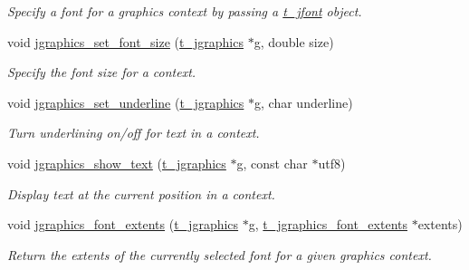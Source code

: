 \begin{DoxyCompactItemize}
\begin{DoxyCompactList}\small\item\em Specify a font for a graphics context by passing a \hyperlink{group__jfont_ga75f83f853e52af957c799723cac89ae5}{t\_\-jfont} object. \item\end{DoxyCompactList}\item 
void \hyperlink{group__jgraphics_gaf8c17f34bfbcd09ea7ba324a6a35cc9d}{jgraphics\_\-set\_\-font\_\-size} (\hyperlink{group__jgraphics_ga4bf27bd7e21a59a427481b909d4656e7}{t\_\-jgraphics} $\ast$g, double size)
\begin{DoxyCompactList}\small\item\em Specify the font size for a context. \item\end{DoxyCompactList}\item 
void \hyperlink{group__jgraphics_ga6753504ad26f256016c34681672d3478}{jgraphics\_\-set\_\-underline} (\hyperlink{group__jgraphics_ga4bf27bd7e21a59a427481b909d4656e7}{t\_\-jgraphics} $\ast$g, char underline)
\begin{DoxyCompactList}\small\item\em Turn underlining on/off for text in a context. \item\end{DoxyCompactList}\item 
void \hyperlink{group__jgraphics_ga91b780fe7e636c4497d0f8ab0ebfd41e}{jgraphics\_\-show\_\-text} (\hyperlink{group__jgraphics_ga4bf27bd7e21a59a427481b909d4656e7}{t\_\-jgraphics} $\ast$g, const char $\ast$utf8)
\begin{DoxyCompactList}\small\item\em Display text at the current position in a context. \item\end{DoxyCompactList}\item 
void \hyperlink{group__jgraphics_ga4f556e322638d6427c2ecc7932d806ed}{jgraphics\_\-font\_\-extents} (\hyperlink{group__jgraphics_ga4bf27bd7e21a59a427481b909d4656e7}{t\_\-jgraphics} $\ast$g, \hyperlink{structt__jgraphics__font__extents}{t\_\-jgraphics\_\-font\_\-extents} $\ast$extents)
\begin{DoxyCompactList}\small\item\em Return the extents of the currently selected font for a given graphics context. \item\end{DoxyCompactList}\item 

\end{DoxyCompactItemize}
